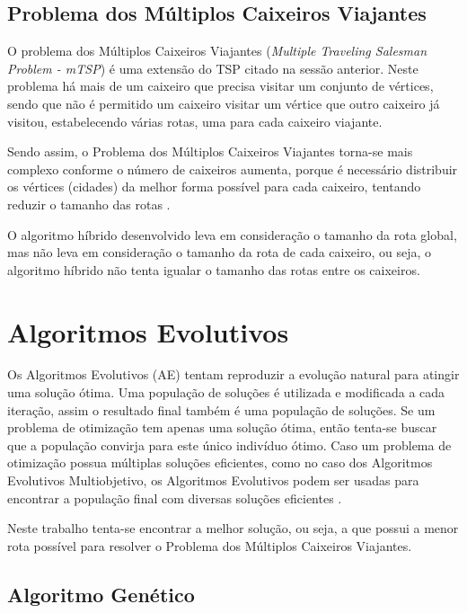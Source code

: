 \documentclass[12pt,openright,a4paper,oneside]{tcc}
\begin{document}
	\section{Problema dos Múltiplos Caixeiros Viajantes}

		O problema dos Múltiplos Caixeiros Viajantes (\textit{Multiple Traveling Salesman Problem - mTSP}) é uma extensão do TSP citado na sessão anterior.
		Neste problema há mais de um caixeiro que precisa visitar um conjunto de vértices, sendo que não é permitido um caixeiro visitar um vértice que outro caixeiro já visitou, estabelecendo várias rotas, uma para cada caixeiro viajante.

		Sendo assim, o Problema dos Múltiplos Caixeiros Viajantes torna-se  mais complexo conforme o número de caixeiros aumenta, porque é necessário distribuir os vértices (cidades) da melhor forma possível para cada caixeiro, tentando reduzir o tamanho das rotas \cite{dissertation}. 

		O algoritmo híbrido desenvolvido leva em consideração o tamanho da rota global, mas não leva em consideração o tamanho da rota de cada caixeiro, ou seja, o algoritmo híbrido não tenta igualar o tamanho das rotas entre os caixeiros.
	
    \chapter{Algoritmos Evolutivos}

        Os Algoritmos Evolutivos (AE) tentam reproduzir a evolução natural para atingir uma solução ótima. Uma população de soluções é utilizada e modificada a cada iteração, assim o resultado final também é uma população de soluções. Se um problema de otimização tem apenas uma solução ótima, então tenta-se buscar que a população convirja para este único indivíduo ótimo. Caso um problema de otimização possua múltiplas soluções eficientes, como no caso dos Algoritmos Evolutivos Multiobjetivo, os Algoritmos Evolutivos podem ser usadas para encontrar a população final com diversas soluções eficientes \cite{malvezzi}.

        Neste trabalho tenta-se encontrar a melhor solução, ou seja, a que possui a menor rota possível para resolver o Problema dos Múltiplos Caixeiros Viajantes.

	\section{Algoritmo Genético}
\end{document}
